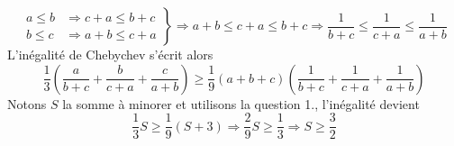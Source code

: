 \begin{enumerate}
\begin{enumerate}
\begin{displaymath}
\left. 
\begin{aligned}
 a\leq b &\Rightarrow c+a \leq b+c \\
 b\leq c &\Rightarrow a+b \leq c+a 
\end{aligned}
 \right\rbrace \Rightarrow
a+b \leq c+a \leq b+c 
\Rightarrow
\frac{1}{b+c} \leq \frac{1}{c+a} \leq \frac{1}{a+b}
\end{displaymath}
L'inégalité de Chebychev s'écrit alors
\begin{displaymath}
 \frac{1}{3}\left(\frac{a}{b+c}+\frac{b}{c+a}+\frac{c}{a+b} \right) \geq
\frac{1}{9}\left( a+b+c\right)\left( \frac{1}{b+c} + \frac{1}{c+a} + \frac{1}{a+b}\right)   
\end{displaymath}
Notons $S$ la somme à minorer et utilisons la question 1., l'inégalité devient
\begin{displaymath}
 \frac{1}{3}S\geq\frac{1}{9}(S+3)\Rightarrow \frac{2}{9}S \geq \frac{1}{3} \Rightarrow S\geq \frac{3}{2}
\end{displaymath}
\end{enumerate}

\end{enumerate}

